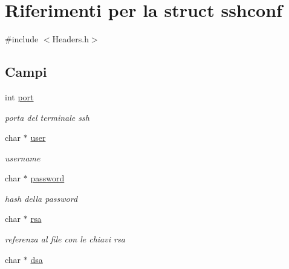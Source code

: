 \hypertarget{structsshconf}{}\section{Riferimenti per la struct sshconf}
\label{structsshconf}


{\ttfamily \#include $<$Headers.\+h$>$}

\subsection*{Campi}
\begin{DoxyCompactItemize}
\item 
int \hyperlink{structsshconf_ac7a42459cfc0b74b311112a8213aea2f}{port}\hypertarget{structsshconf_ac7a42459cfc0b74b311112a8213aea2f}{}\label{structsshconf_ac7a42459cfc0b74b311112a8213aea2f}

\begin{DoxyCompactList}\small\item\em porta del terminale ssh \end{DoxyCompactList}\item 
char $\ast$ \hyperlink{structsshconf_a0f7971696b5f2cc4a30c31cfb2324083}{user}\hypertarget{structsshconf_a0f7971696b5f2cc4a30c31cfb2324083}{}\label{structsshconf_a0f7971696b5f2cc4a30c31cfb2324083}

\begin{DoxyCompactList}\small\item\em username \end{DoxyCompactList}\item 
char $\ast$ \hyperlink{structsshconf_a72e52ee8742a96bb28def3acb0996eef}{password}\hypertarget{structsshconf_a72e52ee8742a96bb28def3acb0996eef}{}\label{structsshconf_a72e52ee8742a96bb28def3acb0996eef}

\begin{DoxyCompactList}\small\item\em hash della password \end{DoxyCompactList}\item 
char $\ast$ \hyperlink{structsshconf_a4a8815987288dd2e91d0b52423bf4c08}{rsa}\hypertarget{structsshconf_a4a8815987288dd2e91d0b52423bf4c08}{}\label{structsshconf_a4a8815987288dd2e91d0b52423bf4c08}

\begin{DoxyCompactList}\small\item\em referenza al file con le chiavi rsa \end{DoxyCompactList}\item 
char $\ast$ \hyperlink{structsshconf_aaee9b07232c521cf70c3f4469b4180eb}{dsa}\hypertarget{structsshconf_aaee9b07232c521cf70c3f4469b4180eb}{}\label{structsshconf_aaee9b07232c521cf70c3f4469b4180eb}


\end{DoxyCompactItemize}
